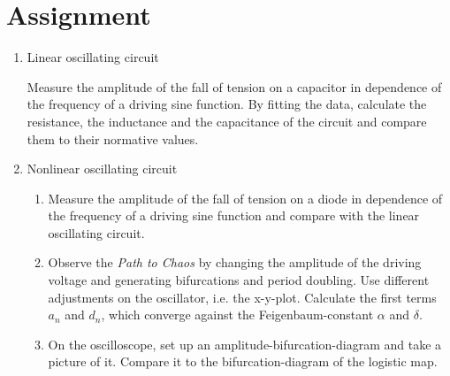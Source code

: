 \section{Assignment}

\begin{enumerate}
\item Linear oscillating circuit

Measure the amplitude of the fall of tension on a capacitor in dependence of the frequency of a driving sine function. By fitting the data, calculate the resistance, the inductance and the capacitance of the circuit and compare them to their normative values.

\item Nonlinear oscillating circuit 

\begin{enumerate}

\item Measure the amplitude of the fall of tension on a diode in dependence of the frequency of a driving sine function and compare with the linear oscillating circuit.
\item Observe the \emph{Path to Chaos} by changing the amplitude of the driving voltage and generating bifurcations and period doubling. Use different adjustments on the oscillator, i.e. the x-y-plot. Calculate the first terms $a_n$ and $d_n$, which converge against the Feigenbaum-constant $\alpha$ and $\delta$.
\item On the oscilloscope, set up an amplitude-bifurcation-diagram and take a picture of it. Compare it to the bifurcation-diagram of the logistic map.

\end{enumerate}
\end{enumerate}